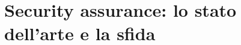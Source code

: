 \documentclass[../main.tex]{subfiles}
\begin{document}
\chapter{Security assurance: lo stato dell'arte e la sfida}
\end{document}
